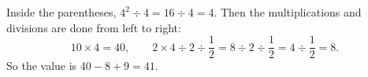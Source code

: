 Inside the parentheses, $4^2\div4=16\div4=4$. Then the multiplications and divisions are done from left to right:
\[10\times4=40,\qquad 2\times4\div2\div\dfrac12=8\div2\div\dfrac12=4\div\dfrac12=8.\]
So the value is $40-8+9=\boxed{41}$.
